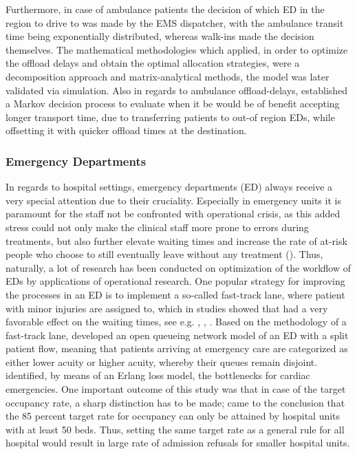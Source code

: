 \documentclass[11pt,a4paper]{article}
\begin{document}
\begin{spacing}{1.8}
Furthermore, in case of ambulance patients the decision  of which ED in the region to drive to  was made by the EMS dispatcher, with the ambulance transit time being exponentially distributed, whereas walk-ins made the decision themselves.
The mathematical methodologies which  \citet{Almehdawe2016} applied, in order to optimize the offload delays and obtain the optimal allocation strategies,  were a decomposition approach and matrix-analytical methods, the model was later validated via simulation.
Also in regards to ambulance offload-delays, \citep{Li2021}  established a Markov decision process to evaluate when it be would be of benefit accepting  longer transport time, due to transferring patients to out-of region EDs, while offsetting it with quicker offload times at the destination.  

\subsubsection{Emergency Departments}
In regards to hospital settings, emergency departments (ED) always receive a very special attention due to their cruciality. Especially in emergency units it is paramount for the staff not be confronted with operational crisis, as this added stress could not only make the clinical staff more prone to errors during treatments, but also further elevate waiting times and increase the rate of at-risk people who choose to still eventually leave without any treatment (\citep{Cochran2009}). Thus, naturally, a lot of research has been conducted on optimization of the workflow of EDs by applications of operational research. One popular strategy for 
improving the processes in an ED is to implement a so-called fast-track lane, where patient with minor injuries are assigned to, which in studies showed that had a very favorable effect on the waiting times, see e.g. \citep{Cooke2002}, \citep{Nash2007}, \citep{Sanchez2006}. 
Based on the methodology of a fast-track lane, \citet{Cochran2009} developed an open queueing network model of an ED with a split patient flow, meaning that patients arriving at emergency care are categorized as either lower acuity or higher acuity, whereby their queues remain disjoint. 
\citet{Bruin2007} identified, by means of an Erlang loss model, the bottlenecks for cardiac emergencies. One important outcome of this study was that in case of the target occupancy rate, a sharp distinction has to be made;  \citet{Bruin2007} came to the conclusion that the 85 percent target rate for occupancy can only be attained by hospital units with at least 50 beds. Thus, setting the same target rate as a general rule for all hospital would result in large rate of admission refusals for smaller hospital units.

\end{spacing}
\end{document}
